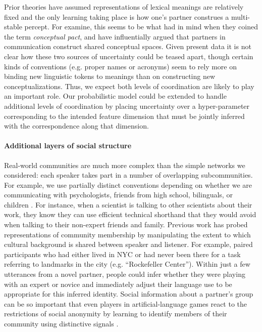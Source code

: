 Prior theories have assumed representations of lexical meanings are relatively fixed and the only learning taking place is how one's partner construes a multi-stable percept. 
For examine, this seems to be what  had in mind when they coined the term \emph{conceptual pact}, and \cite{stolk2016conceptual} have influentially argued that partners in communication construct shared conceptual spaces. 
Given present data it is not clear how these two sources of uncertainty could be teased apart, though certain kinds of conventions (e.g. proper names or acronyms) seem to rely more on binding new linguistic tokens to meanings than on constructing new conceptualizations.
Thus, we expect both levels of coordination are likely to play an important role. 
Our probabilistic model could be extended to handle additional levels of coordination by placing uncertainty over a hyper-parameter corresponding to the intended feature dimension that must be jointly inferred with the correspondence along that dimension. 


\paragraph{Additional layers of social structure}

Real-world communities are much more complex than the simple networks we considered: each speaker takes part in a number of overlapping subcommunities. 
For example, we use partially distinct conventions depending on whether we are communicating with psychologists, friends from high school, bilinguals, or children \cite{auer_code-switching_2013}.
For instance, when a scientist is talking to other scientists about their work, they know they can use efficient technical shorthand that they would avoid when talking to their non-expert friends and family. 
Previous work has probed representations of community membership by manipulating the extent to which cultural background is shared between speaker and listener.
For example,  paired participants who had either lived in NYC or had never been there for a task referring to landmarks in the city (e.g. ``Rockefeller Center''). 
Within just a few utterances from a novel partner, people could infer whether they were playing with an expert or novice and immediately adjust their language use to be appropriate for this inferred identity. 
Social information about a partner’s group can be so important that even players in artificial-language games react to the restrictions of social anonymity by learning to identify members of their community using distinctive signals \cite{roberts_experimental_2010}.

